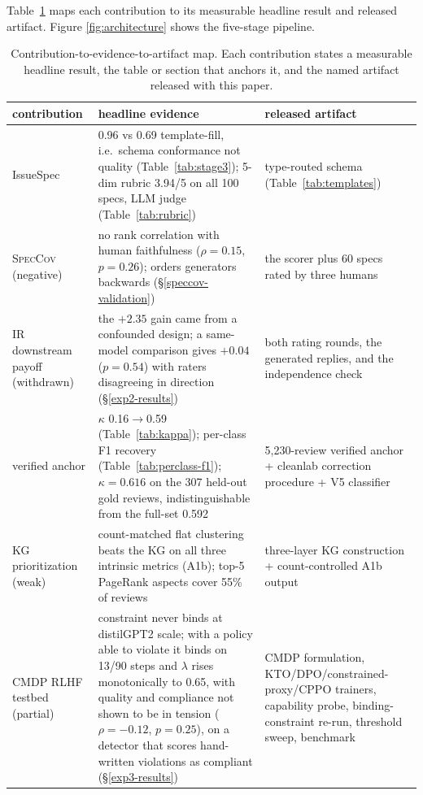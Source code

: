 \documentclass[sigconf, anonymous]{acmart}
\begin{document}
Table~\ref{tab:c2evidence} maps each contribution to its measurable headline result and
  released artifact. Figure \ref{fig:architecture} shows the five-stage
pipeline. 

\begin{table}[!htbp]\centering\footnotesize
\caption{Contribution-to-evidence-to-artifact map. Each contribution states a measurable headline result, the table or section that anchors it, and the named artifact released with this paper.}\label{tab:c2evidence}
\begin{tabular}{@{}p{1.5cm}p{3.0cm}p{2.9cm}@{}}\toprule
contribution & headline evidence & released artifact \\\midrule
IssueSpec & 0.96 vs 0.69 template-fill, i.e.\ schema conformance not quality (Table~\ref{tab:stage3}); 5-dim rubric 3.94/5 on all 100 specs, LLM judge (Table~\ref{tab:rubric}) & type-routed schema (Table~\ref{tab:templates}) \\
\textsc{SpecCov} (negative) & no rank correlation with human faithfulness ($\rho=0.15$, $p=0.26$); orders generators backwards (\S\ref{speccov-validation}) & the scorer plus 60 specs rated by three humans \\
IR downstream payoff (withdrawn) & the $+2.35$ gain came from a confounded design; a same-model comparison gives $+0.04$ ($p=0.54$) with raters disagreeing in direction (\S\ref{exp2-results}) & both rating rounds, the generated replies, and the independence check \\
verified anchor & $\kappa$ 0.16$\to$0.59 (Table~\ref{tab:kappa}); per-class F1 recovery
  (Table~\ref{tab:perclass-f1}); $\kappa = 0.616$ on the 307 held-out gold reviews, indistinguishable from the full-set 0.592 & 5{,}230-review
  verified anchor + cleanlab correction procedure + V5 classifier \\
KG prioritization (weak) & count-matched flat clustering beats the KG on all three intrinsic metrics (A1b); top-5 PageRank aspects cover 55\% of reviews & three-layer KG construction + count-controlled A1b output \\
CMDP RLHF testbed (partial) & constraint never binds at distilGPT2 scale; with a policy able to
  violate it binds on 13/90 steps and $\lambda$ rises monotonically to 0.65, with quality and
  compliance not shown to be in tension ($\rho = -0.12$, $p = 0.25$), on a detector that scores
  hand-written violations as compliant
  (\S\ref{exp3-results}) & CMDP formulation, KTO/DPO/constrained-proxy/CPPO trainers, capability
  probe, binding-constraint re-run, threshold sweep, benchmark \\
\bottomrule\end{tabular}\end{table}
\end{document}
